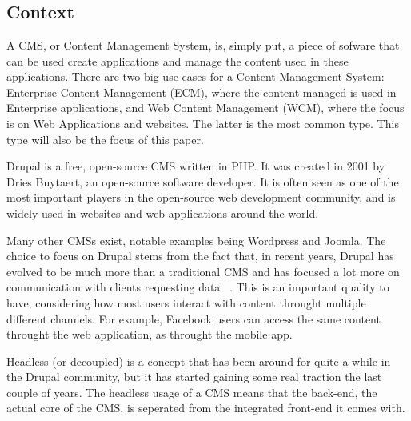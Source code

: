 
\chapter{}
\label{ch:inleiding}

\section{Context}
A CMS, or Content Management System, is, simply put, a piece of sofware that can be used create applications and manage the content used in these applications. There are two big use cases for a Content Management System: Enterprise Content Management (ECM), where the content managed is used in Enterprise applications, and Web Content Management (WCM), where the focus is on Web Applications and websites. The latter is the most common type. This type will also be the focus of this paper.

Drupal is a free, open-source CMS written in PHP. It was created in 2001 by Dries Buytaert, an open-source software developer. It is often seen as one of the most important players in the open-source web development community, and is widely used in websites and web applications around the world.

Many other CMSs exist, notable examples being Wordpress and Joomla. The choice to focus on Drupal stems from the fact that, in recent years, Drupal has evolved to be much more than a traditional CMS and has focused a lot more on communication with clients requesting data ~\autocite{So2018}. This is an important quality to have, considering how most users interact with content throught multiple different channels. For example, Facebook users can access the same content throught the web application, as throught the mobile app.

Headless (or decoupled) is a concept that has been around for quite a while in the Drupal community, but it has started gaining some real traction the last couple of years. The headless usage of a CMS means that the back-end, the actual core of the CMS, is seperated from the integrated front-end it comes with. 

\section{}
\label{sec:probleemstelling}

